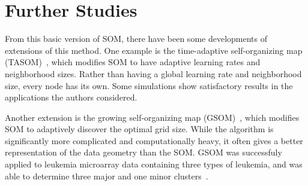 \section{Further Studies}

From this basic version of SOM,
there have been some developments of extensions of this method.
One example is the time-adaptive self-organizing map (TASOM)~\cite{shah:2003},
which modifies SOM to have adaptive learning rates and neighborhood sizes.
Rather than having a global learning rate and neighborhood size,
every node has its own.
Some simulations show satisfactory results in the applications the authors considered.

Another extension is the growing self-organizing map (GSOM)~\cite{hsu:2003},
which modifies SOM to adaptively discover the optimal grid size.
While the algorithm is significantly more complicated and computationally heavy,
it often gives a better representation of the data geometry than the SOM\@.
GSOM was successfuly applied to leukemia microarray data
containing three types of leukemia,
and was able to determine three major and one minor clusters~\cite{hsu:2003}.

